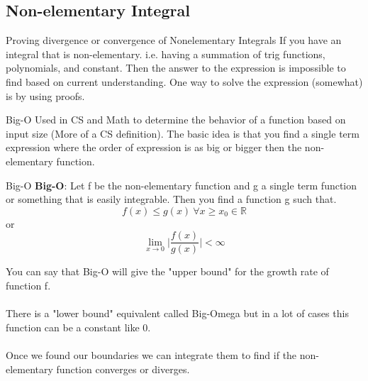 \documentclass[letterpaper,10pt,twoside,twocolumn,openany]{book}
\begin{document}
\subsection{Non-elementary Integral}
\begin{DndSidebar}{Proving divergence or convergence of Nonelementary Integrals}
    If you have an integral that is non-elementary. i.e. having a summation of trig functions, polynomials, and constant. Then the answer to the expression is impossible to find based on current understanding. One way to solve the expression (somewhat) is by using proofs.  
\end{DndSidebar}
\begin{DndComment}{Big-O}
    Used in CS and Math to determine the behavior of a function based on input size (More of a CS definition). The basic idea is that you find a single term expression where the order of expression is as big or bigger then the non-elementary function.
\end{DndComment}
\newpage
\begin{DndSidebar}{Big-O}
    \textbf{Big-O}:
    Let f be the non-elementary function and g a single term function or something that is easily integrable. Then you find a function g such that.
    \begin{equation*}
        f(x) \leq g(x)\ \forall x \geq x_0 \in \mathbb{R}
    \end{equation*} 
    or 
    \begin{equation*}
        \lim_{x \to 0} \biggl|\frac{f(x)}{g(x)}\biggl| < \infty 
    \end{equation*}
\end{DndSidebar}
You can say that Big-O will give the "upper bound" for the growth rate of function f.
\\~\\ 
There is a "lower bound" equivalent called Big-Omega but in a lot of cases this function can be a constant like 0.
\\~\\ 
Once we found our boundaries we can integrate them to find if the non-elementary function converges or diverges.
\end{document}

